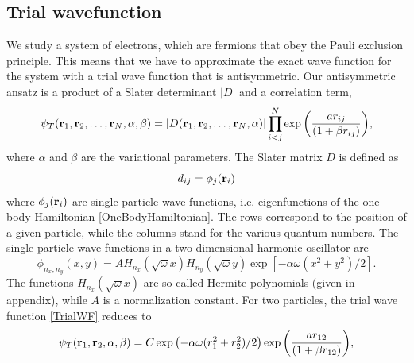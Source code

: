 \documentclass[english, a4paper]{article}
\begin{document}
\subsection{Trial wavefunction}
We study a system of electrons, which are fermions that obey the Pauli exclusion principle.
This means that we have to approximate the exact wave function for the system with a trial
wave function that is antisymmetric. Our antisymmetric ansatz is a product of a Slater determinant $|D|$
and a correlation term,
\begin{equation}
   \psi_{T}({\bf r}_1,{\bf r}_2,\dots, {\bf r}_N, \alpha, \beta) = 
   |D({\bf r}_1,{\bf r}_2,\dots, {\bf r}_N, \alpha)|
   \prod_{i<j}^{N}\exp{\left(\frac{a r_{ij}}{(1+\beta r_{ij})}\right)}, 
   \label{TrialWF}
\end{equation}
where $\alpha$ and $\beta$ are the variational parameters.
The Slater matrix $D$ is defined as
\begin{equation}
 d_{ij} = \phi_j({\bf r}_i)
 \label{slaterMatrix}
\end{equation}
where $\phi_j({\bf r}_i)$ are single-particle wave functions, i.e. eigenfunctions of the one-body 
Hamiltonian \eqref{OneBodyHamiltonian}. The rows correspond to the position of a given particle, 
while the columns stand for the various quantum numbers.
The single-particle wave functions in a two-dimensional harmonic oscillator are
\begin{equation}
 \phi_{n_x,n_y}(x,y) = A H_{n_x}(\sqrt{\omega}x)H_{n_y}(\sqrt{\omega}y)\exp{[-\alpha\omega(x^2+y^2)/2]}.
\end{equation}
The functions $H_{n_x}(\sqrt{\omega}x)$ are so-called Hermite polynomials (given in appendix), while
$A$ is a normalization constant. 
For two particles, the trial wave function \eqref{TrialWF} reduces to
\begin{equation}
   \psi_{T}({\bf r}_1,{\bf r}_2, \alpha, \beta) = 
   C\exp{\left(-\alpha\omega(r_1^2+r_2^2)/2\right)}
   \exp{\left(\frac{ar_{12}}{(1+\beta r_{12})}\right)}, 
\label{trialWF2}
\end{equation}

 
\end{document}
